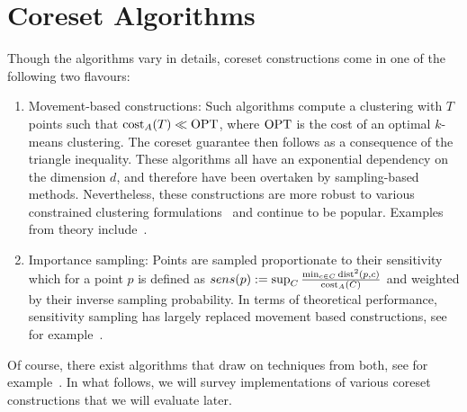 \section{Coreset Algorithms}
\label{sec:algorithms}

Though the algorithms vary in details, coreset constructions come in one of the following two flavours:
\begin{enumerate}
\item Movement-based constructions: Such algorithms compute a clustering with $T$ points such that $\text{cost}_A(T)\ll \text{OPT}$, where $\text{OPT}$ is the cost of an optimal $k$-means clustering. 
The coreset guarantee then follows as a consequence of the triangle inequality. These algorithms all have an exponential dependency on the dimension $d$, and therefore have been overtaken by sampling-based methods. Nevertheless, these constructions are more robust to various constrained clustering formulations~\cite{HuangJV19,SSS19} and continue to be popular. Examples from theory include~\cite{FrahlS2005,HaM04}. 
\item Importance sampling: Points are sampled proportionate to their sensitivity which for a point $p$ is defined as $sens(p):=\sup_{C} \frac{\min_{c\in C} \text{dist}^2(p,c)}{\text{cost}_A(C)}$ and weighted by their inverse sampling probability. In terms of theoretical performance, sensitivity sampling has largely replaced movement based constructions, see for example~\cite{FeldmanL11,LangbergS10}.  
\end{enumerate}

Of course, there exist algorithms that draw on techniques from both, see for example~\cite{Cohen-AddadSS21}. In what follows, we will survey implementations of various coreset constructions that we will evaluate later.



